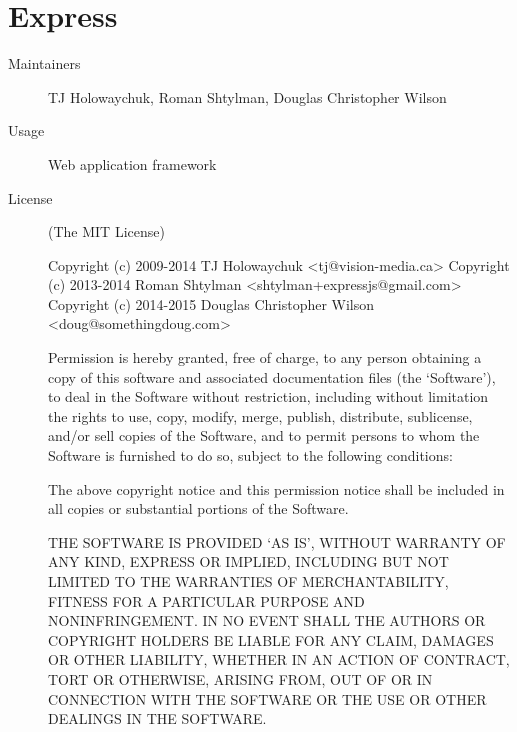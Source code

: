  \section*{Express}
    \begin{description}
      \item[Maintainers] TJ Holowaychuk, Roman Shtylman, Douglas Christopher Wilson
      \item[Usage] Web application framework
      \item[License] \scriptsize (The MIT License)

        Copyright (c) 2009-2014 TJ Holowaychuk <tj@vision-media.ca>
        Copyright (c) 2013-2014 Roman Shtylman <shtylman+expressjs@gmail.com>
        Copyright (c) 2014-2015 Douglas Christopher Wilson <doug@somethingdoug.com>

        Permission is hereby granted, free of charge, to any person obtaining
        a copy of this software and associated documentation files (the
        `Software'), to deal in the Software without restriction, including
        without limitation the rights to use, copy, modify, merge, publish,
        distribute, sublicense, and/or sell copies of the Software, and to
        permit persons to whom the Software is furnished to do so, subject to
        the following conditions:

        The above copyright notice and this permission notice shall be
        included in all copies or substantial portions of the Software.

        THE SOFTWARE IS PROVIDED `AS IS', WITHOUT WARRANTY OF ANY KIND,
        EXPRESS OR IMPLIED, INCLUDING BUT NOT LIMITED TO THE WARRANTIES OF
        MERCHANTABILITY, FITNESS FOR A PARTICULAR PURPOSE AND NONINFRINGEMENT.
        IN NO EVENT SHALL THE AUTHORS OR COPYRIGHT HOLDERS BE LIABLE FOR ANY
        CLAIM, DAMAGES OR OTHER LIABILITY, WHETHER IN AN ACTION OF CONTRACT,
        TORT OR OTHERWISE, ARISING FROM, OUT OF OR IN CONNECTION WITH THE
        SOFTWARE OR THE USE OR OTHER DEALINGS IN THE SOFTWARE.
    \end{description}

